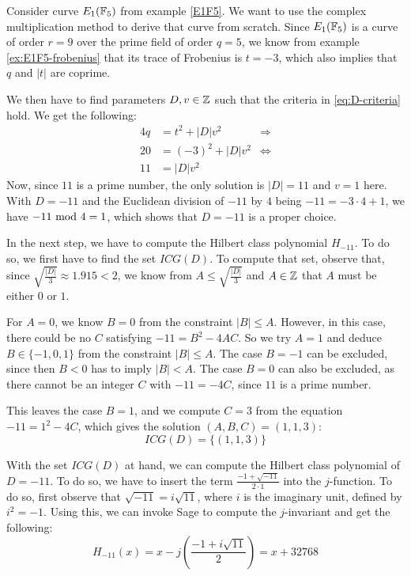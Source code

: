 \begin{example} Consider curve $E_1(\mathbb{F}_5)$ from example \ref{E1F5}. We want to use the complex multiplication method to derive that curve from scratch. Since $E_1(\mathbb{F}_5)$ is a curve of order $r=9$ over the prime field of order $q=5$, we know from example \ref{ex:E1F5-frobenius} that its trace of Frobenius is $t=-3$, which also implies that $q$ and $|t|$ are coprime. 

We then have to find parameters $D,v\in\mathbb{Z}$ such that the criteria in \ref{eq:D-criteria} hold. We get the following:
\begin{align*}
4q & = t^2+ |D|v^2 & \Rightarrow \\
20 & = (-3)^2 + |D|v^2 & \Leftrightarrow \\
11 & = |D|v^2
\end{align*}
Now, since $11$ is a prime number, the only solution is $|D|=11$ and $v=1$ here. With $D=-11$ and  the Euclidean division of $-11$ by $4$ being $-11 = -3\cdot 4 +1$, we have $-11 \text{ mod } 4=1$, which shows that $D=-11$ is a proper choice.

In the next step, we have to compute the Hilbert class polynomial $H_{-11}$. To do so, we first have to find the set $ICG(D)$. To compute that set, observe that, since $\sqrt{\frac{|D|}{3}}\approx 1.915<2$, we know from $A\leq \sqrt{\frac{|D|}{3}}$ and $A\in\mathbb{Z}$ that $A$ must be either $0$ or $1$. 

For $A=0$, we know $B=0$ from the constraint $|B|\leq A$. However, in this case, there could be no $C$ satisfying $-11= B^2 -4AC$. So we try $A=1$ and deduce $B\in\{-1,0,1\}$ from the constraint $|B|\leq A$. The case $B=-1$ can be excluded, since then $B<0$ has to imply $|B|<A$. The case $B=0$ can also be excluded, as there cannot be an integer $C$ with $-11 = -4C$, since $11$ is a prime number. 

This leaves the case $B=1$, and we compute $C=3$ from the equation $-11 = 1^2 -4C$, which gives the solution $(A,B,C)=(1,1,3)$:
$$
ICG(D)=\{(1,1,3)\}
$$

With the set $ICG(D)$ at hand, we can compute the Hilbert class polynomial of $D=-11$. To do so, we have to insert the term $\frac{-1+\sqrt{-11}}{2\cdot1}$ into the $j$-function. To do so, first observe that $\sqrt{-11}=i\sqrt{11}$, where $i$ is the imaginary unit, defined by $i^2=-1$. Using this, we can invoke Sage to compute the $j$-invariant and get the following:
$$
H_{-11}(x) = x - j\left(\frac{-1+i\sqrt{11}}{2}\right) = x + 32768
$$


\end{example}
